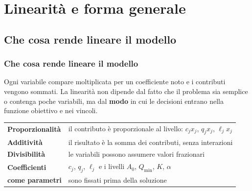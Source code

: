

\section{Linearit\`{a} e forma generale}



\subsection{Che cosa rende lineare il modello}%

\begin{frame}%
%

\frametitle{Che cosa rende lineare il modello}%
%

%


Ogni variabile compare moltiplicata per un coefficiente noto e i contributi
vengono sommati. La linearit\`{a} non dipende dal fatto che il problema sia
semplice o contenga poche variabili, ma dal \textbf{modo} in cui le decisioni
entrano nella funzione obiettivo e nei vincoli.

\medskip

\begin{center}
{\small
\begin{tabular}
[c]{ll}\hline
\textbf{Proporzionalit\`{a}} & il contributo \`{e} proporzionale al livello:
$c_{j}x_{j}$, $q_{j}x_{j}$, $\ell_{j}x_{j}$\\[3pt]%
\textbf{Additivit\`{a}} & il risultato \`{e} la somma dei contributi, senza
interazioni\\[3pt]%
\textbf{Divisibilit\`a} & le variabili possono assumere valori
frazionari\\[3pt]%
\textbf{Coefficienti} & $c_{j}$, $q_{j}$, $\ell_{j}$ e i livelli $A_{0}$,
$Q_{\min}$, $K$, $\alpha$\\
\quad\textbf{come parametri} & sono fissati prima della soluzione\\\hline
\end{tabular}
}
\end{center}

\medskip


\end{frame}
